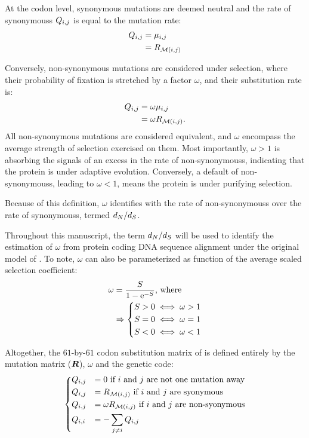 At the \gls{codon} level, synonymous mutations are deemed \gls{neutral} and the rate of \glspl{synonymous} ${Q_{{i}, {j}}}$ is equal to the mutation rate:
\begin{align}
    Q_{{i}, {j}} & = \mu_{{i}, {j}} \\
    & = R_{\mathcal{M}({i}, {j})}
\end{align}

Conversely, non-synonymous mutations are considered under selection, where their probability of fixation is stretched by a factor $\omega$, and their \gls{substitution} rate is:
\begin{align}
    Q_{{i}, {j}} & = \omega \mu_{{i}, {j}} \\
    & = \omega R_{\mathcal{M}({i}, {j})}.
\end{align}
All non-synonymous mutations are considered equivalent, and $\omega$ encompass the average strength of selection exercised on them.
Most importantly, $\omega>1$ is absorbing the signals of an excess in the rate of \glspl{non-synonymous}, indicating that the protein is under adaptive evolution.
Conversely, a default of \glspl{non-synonymous}, leading to $\omega<1$, means the protein is under purifying selection.


Because of this definition, $\omega$ identifies with the rate of \glspl{non-synonymous} over the rate of \glspl{synonymous}, termed $d_N / d_S$.

Throughout this manuscript, the term $d_N / d_S$ will be used to identify the estimation of $\omega$ from protein coding \acrshort{DNA} sequence alignment under the original model of \citet{Muse1994}.
To note, $\omega$ can also be parameterized as function of the average scaled selection coefficient:
\begin{align}
    \omega & = \dfrac{S}{1 - \mathrm{e}^{-S}} \text{, where }\\
    & \Rightarrow    \begin{dcases}
                         S > 0 \iff \omega > 1 \\
                         S = 0 \iff \omega = 1 \\
                         S < 0 \iff \omega < 1
    \end{dcases}
\end{align}

Altogether, the $61$-by-$61$ \gls{codon} \gls{substitution} matrix of \citet{Muse1994} is defined entirely by the mutation matrix ($\bm{R}$), $\omega$ and the genetic code:
\begin{equation}
    \begin{dcases}
        Q_{{i}, {j}} & = 0 \text{ if ${i}$ and ${j}$ are not one mutation away} \\
        Q_{{i}, {j}} & = R_{\mathcal{M}({i}, {j})} \text{ if ${i}$ and ${j}$ are syonymous} \\
        Q_{{i}, {j}} & = \omega R_{\mathcal{M}({i}, {j})} \text{ if ${i}$ and ${j}$ are non-syonymous} \\
        Q_{{i}, {i}} & = - \sum\limits_{{j} \neq {i}} Q_{{i}, {j}}
    \end{dcases}
    \label{eq:codon-models}
\end{equation}

